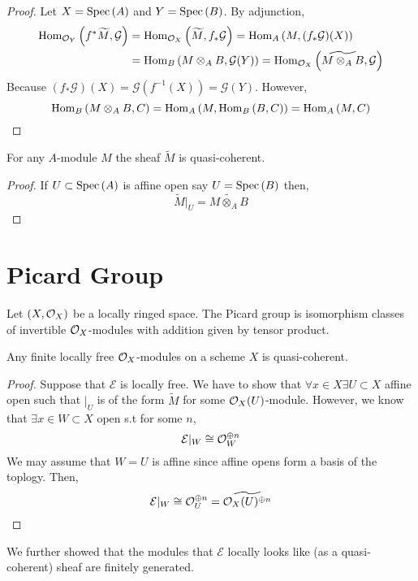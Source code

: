 \documentclass[12pt]{article}
\begin{document}
\begin{proof}
Let $X = \mathrm{Spec}\left( A \right)$ and $Y = \mathrm{Spec}\left( B \right)$. By adjunction,
\begin{align*}
\mathrm{Hom}_{\mathcal{O}_{Y}} \left( f^* \widetilde{M}, \mathcal{G} \right) & = \mathrm{Hom}_{\mathcal{O}_{X}} \left( \widetilde{M}, f_* \mathcal{G} \right) = \mathrm{Hom}_{A} \left( M, (f_* \mathcal{G})(X) \right)
\\
& = \mathrm{Hom}_{B} \left( M \otimes_A B, \mathcal{G}(Y) \right) = \mathrm{Hom}_{\mathcal{O}_{X}} \left( \widetilde{M \otimes_A B}, \mathcal{G} \right)
\end{align*}
Because $(f_* \mathcal{G})(X) = \mathcal{G}(f^{-1}(X)) = \mathcal{G}(Y)$. However, 
\[ \mathrm{Hom}_{B} \left( M \otimes_A B, C \right) = \mathrm{Hom}_{A} \left( M, \mathrm{Hom}_{B} \left( B, C \right) \right) = \mathrm{Hom}_{A} \left( M, C \right) \]
\end{proof}

\begin{proposition}
For any $A$-module $M$ the sheaf $\widetilde{M}$ is quasi-coherent.
\end{proposition}

\begin{proof}
If $U \subset \mathrm{Spec}\left( A \right)$ is affine open say $U = \mathrm{Spec}\left( B \right)$ then,
\[ \widetilde{M}|_U = \widetilde{M \otimes_A B} \]
\end{proof}

\section{Picard Group}

Let $(X, \mathcal{O}_{X})$ be a locally ringed space. The Picard group is isomorphism classes of invertible $\mathcal{O}_{X}$-modules with addition given by tensor product. 

\begin{proposition}
Any finite locally free $\mathcal{O}_{X}$-modules on a scheme $X$ is quasi-coherent.
\end{proposition}

\begin{proof}
Suppose that  $\mathcal{E}$ is locally free. We have to show that $\forall x \in X \exists U \subset X$ affine open such that $\mathcal |_U$ is of the form $\tilde{M}$ for some $\mathcal{O}_{X}(U)$-module. However, we know that $\exists x \in W \subset X$ open s.t for some $n$,
\[ \mathcal{E}|_W \cong \mathcal{O}_{W}^{\oplus n} \] 
We may assume that $W = U$ is affine since affine opens form  a basis of the toplogy. Then,
\[ \mathcal{E}|_W \cong \mathcal{O}_{U}^{\oplus n} = \widetilde{\mathcal{O}_{X}(U)^{\oplus n}} \]
\end{proof}

\begin{remark}
We further showed that the modules that $\mathcal{E}$ locally looks like (as a quasi-coherent) sheaf are finitely generated.
\end{remark}
\end{document}
